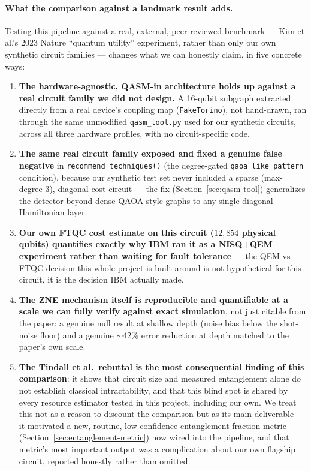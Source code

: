 \documentclass[9pt,twocolumn]{extarticle}
\begin{document}
\paragraph{What the comparison against a landmark result adds.} Testing
this pipeline against a real, external, peer-reviewed benchmark --- Kim et
al.'s 2023 Nature ``quantum utility'' experiment, rather than only our own
synthetic circuit families --- changes what we can honestly claim, in five
concrete ways:
\begin{enumerate}
  \item \textbf{The hardware-agnostic, QASM-in architecture holds up
  against a real circuit family we did not design.} A 16-qubit subgraph
  extracted directly from a real device's coupling map (\texttt{FakeTorino}),
  not hand-drawn, ran through the same unmodified \texttt{qasm\_tool.py}
  used for our synthetic circuits, across all three hardware profiles,
  with no circuit-specific code.
  \item \textbf{The same real circuit family exposed and fixed a genuine
  false negative} in \texttt{recommend\_techniques()} (the degree-gated
  \texttt{qaoa\_like\_pattern} condition), because
  our synthetic test set never included a sparse (max-degree-3), diagonal-cost
  circuit --- the fix (Section~\ref{sec:qasm-tool}) generalizes the
  detector beyond dense QAOA-style graphs to any single diagonal
  Hamiltonian layer.
  \item \textbf{Our own FTQC cost estimate on this circuit
  ($12{,}854$ physical qubits) quantifies exactly why IBM ran it as a
  NISQ+QEM experiment rather than waiting for fault tolerance} --- the
  QEM-vs-FTQC decision this whole project is built around is not
  hypothetical for this circuit, it is the decision IBM actually made.
  \item \textbf{The ZNE mechanism itself is reproducible and quantifiable
  at a scale we can fully verify against exact simulation}, not just
  citable from the paper: a genuine null result at shallow depth (noise
  bias below the shot-noise floor) and a genuine $\sim$42\% error
  reduction at depth matched to the paper's own scale.
  \item \textbf{The Tindall et al.\ rebuttal is the most consequential
  finding of this comparison}: it shows that circuit size and measured
  entanglement alone do not establish classical intractability, and that
  this blind spot is shared by every resource estimator tested in this
  project, including our own. We treat this not as a reason to discount
  the comparison but as its main deliverable --- it motivated a new,
  routine, low-confidence entanglement-fraction metric
  (Section~\ref{sec:entanglement-metric}) now wired into the pipeline,
  and that metric's most important output was a complication about our
  own flagship circuit, reported honestly rather than omitted.
\end{enumerate}
\end{document}

